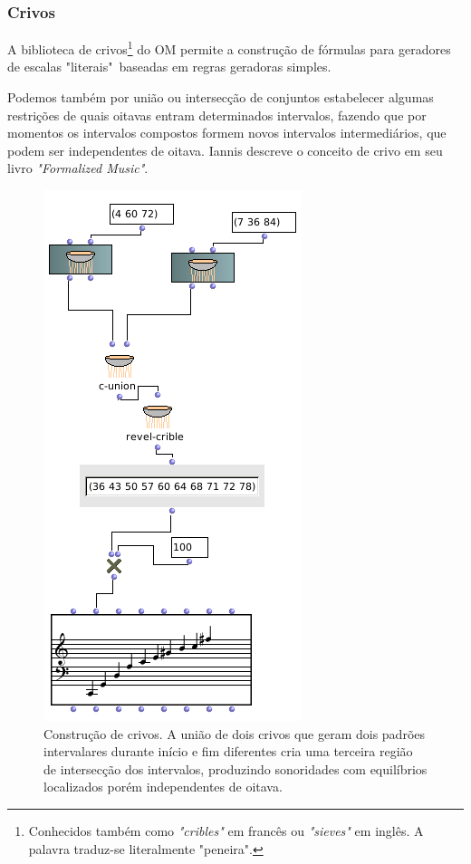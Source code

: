 \documentclass[
	12pt,				%
	openright,			%
	twoside,			%
	a4paper,			%
	english,			%
	french,				%
	spanish,			%
	brazil				%
	]{abntex2}
\begin{document}
\subsubsection{Crivos}

A biblioteca de crivos\footnote{Conhecidos também como \textit{"cribles"} em francês ou \textit{"sieves"} em inglês. A palavra traduz-se literalmente "peneira".} do OM permite a construção de fórmulas para geradores de escalas "literais"\ baseadas em regras geradoras simples.

Podemos também por união ou intersecção de conjuntos estabelecer algumas restrições de quais oitavas entram determinados intervalos, fazendo que por momentos os intervalos compostos formem novos intervalos intermediários, que podem ser independentes de oitava. Iannis  descreve o conceito de crivo em seu livro \textit{"Formalized Music"}.
 
\begin{figure}[!h]
	\caption{\label{fig_grafico}Construção de crivos. A união de dois crivos que geram dois padrões intervalares durante início e fim diferentes cria uma terceira região de intersecção dos intervalos, produzindo sonoridades com equilíbrios localizados porém independentes de oitava. }
	\begin{center}
	    \includegraphics[scale=0.5]{OM_settheory/crivos.png}
	\end{center}
\end{figure}
\end{document}
